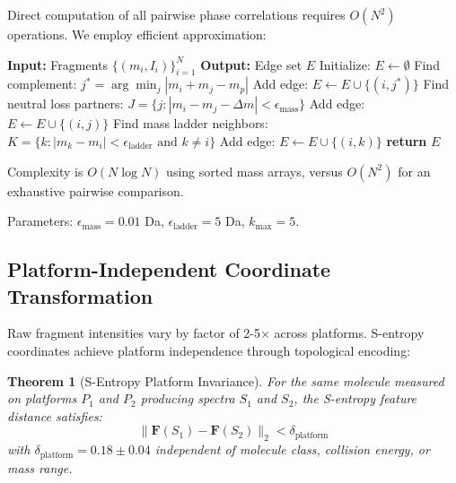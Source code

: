 \documentclass[twocolumn,10pt,a4paper]{article}
\newtheorem{theorem}{Theorem}
\theoremstyle{definition}
\theoremstyle{remark}
\begin{document}
Direct computation of all pairwise phase correlations requires $O(N^2)$ operations. We employ efficient approximation:

\begin{algorithm}[h]
\caption{Efficient Phase-Lock Edge Detection}
\label{alg:edge_detection}
\begin{algorithmic}
\STATE \textbf{Input:} Fragments $\{(m_i, I_i)\}_{i=1}^{N}$
\STATE \textbf{Output:} Edge set $E$
\STATE Initialize: $E \gets \emptyset$
    \STATE Find complement: $j^* = \arg\min_j |m_i + m_j - m_p|$
        \STATE Add edge: $E \gets E \cup \{(i, j^*)\}$ 
    \ENDIF
    \STATE
    \STATE Find neutral loss partners:
        \STATE $J = \{j : |m_i - m_j - \Delta m| < \epsilon_{\text{mass}}\}$
            \STATE Add edge: $E \gets E \cup \{(i, j)\}$ 
        \ENDFOR
    \ENDFOR
    \STATE
    \STATE Find mass ladder neighbors:
    \STATE $K = \{k : |m_k - m_i| < \epsilon_{\text{ladder}} \text{ and } k \neq i\}$
        \STATE Add edge: $E \gets E \cup \{(i, k)\}$ 
    \ENDFOR
\ENDFOR
\STATE \textbf{return} $E$
\end{algorithmic}
\end{algorithm}

Complexity is $O(N \log N)$ using sorted mass arrays, versus $O(N^2)$ for an exhaustive pairwise comparison.

Parameters: $\epsilon_{\text{mass}} = 0.01$ Da, $\epsilon_{\text{ladder}} = 5$ Da, $k_{\max} = 5$.

\subsection{Platform-Independent Coordinate Transformation}

Raw fragment intensities vary by factor of 2-5× across platforms. S-entropy coordinates achieve platform independence through topological encoding:

\begin{theorem}[S-Entropy Platform Invariance]
\label{thm:sentropy_invariance}
For the same molecule measured on platforms $P_1$ and $P_2$ producing spectra $S_1$ and $S_2$, the S-entropy feature distance satisfies:
\begin{equation}
\|\mathbf{F}(S_1) - \mathbf{F}(S_2)\|_2 < \delta_{\text{platform}}
\end{equation}
with $\delta_{\text{platform}} = 0.18 \pm 0.04$ independent of molecule class, collision energy, or mass range.
\end{theorem}
\end{document}
